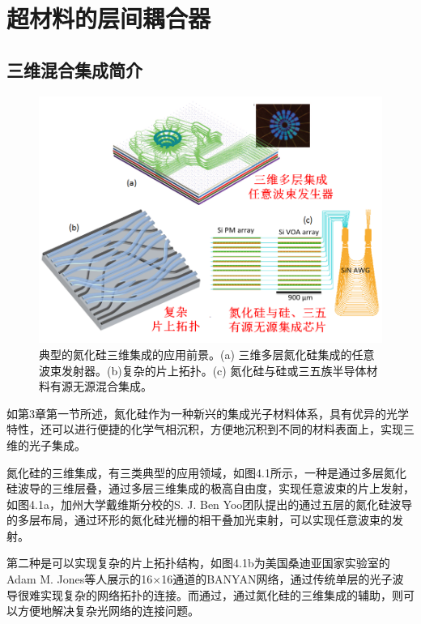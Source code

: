 \chapter{超材料的层间耦合器}\label{chap:4}


\section{三维混合集成简介}

\begin{figure}[!htbp]
    \centering
    \includegraphics[width=1\textwidth]{Img/4-1.png}
    \caption{典型的氮化硅三维集成的应用前景。(a) 三维多层氮化硅集成的任意波束发射器。(b)复杂的片上拓扑。(c) 氮化硅与硅或三五族半导体材料有源无源混合集成。\cite{Jones2013Ultra,Yoo2016Heterogeneous,Dong2016Silicon}}
    \label{fig:4-1}
\end{figure}
如第3章第一节所述，氮化硅作为一种新兴的集成光子材料体系，具有优异的光学特性，还可以进行便捷的化学气相沉积，方便地沉积到不同的材料表面上，实现三维的光子集成。\cite{Xie:15,Geyter2012From}

氮化硅的三维集成，有三类典型的应用领域，如图4.1所示，一种是通过多层氮化硅波导的三维层叠，通过多层三维集成的极高自由度，实现任意波束的片上发射，如图4.1a，加州大学戴维斯分校的S. J. Ben Yoo团队提出的通过五层的氮化硅波导的多层布局，通过环形的氮化硅光栅的相干叠加光束射，可以实现任意波束的发射。\cite{Yoo2016Heterogeneous}

第二种是可以实现复杂的片上拓扑结构，如图4.1b为美国桑迪亚国家实验室的Adam M. Jones等人展示的16×16通道的BANYAN网络，通过传统单层的光子波导很难实现复杂的网络拓扑的连接。而通过，通过氮化硅的三维集成的辅助，则可以方便地解决复杂光网络的连接问题。\cite{Jones2013Ultra}

